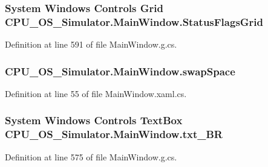 \subsubsection[{Status\+Flags\+Grid}]{\setlength{\rightskip}{0pt plus 5cm}System Windows Controls Grid C\+P\+U\+\_\+\+O\+S\+\_\+\+Simulator.\+Main\+Window.\+Status\+Flags\+Grid\hspace{0.3cm}{\ttfamily [package]}}\label{class_c_p_u___o_s___simulator_1_1_main_window_afdda5e5a39c6e3b99300284ea2640e7c}


Definition at line 591 of file Main\+Window.\+g.\+cs.

\hypertarget{class_c_p_u___o_s___simulator_1_1_main_window_ab9638abdc8d65670240a036bc02d813c}{}
\subsubsection[{swap\+Space}]{ C\+P\+U\+\_\+\+O\+S\+\_\+\+Simulator.\+Main\+Window.\+swap\+Space\hspace{0.3cm}{\ttfamily [private]}}\label{class_c_p_u___o_s___simulator_1_1_main_window_ab9638abdc8d65670240a036bc02d813c}


Definition at line 55 of file Main\+Window.\+xaml.\+cs.

\hypertarget{class_c_p_u___o_s___simulator_1_1_main_window_a7a878022ed4cb948598d3685dc821a00}{}
\subsubsection[{txt\+\_\+\+B\+R}]{\setlength{\rightskip}{0pt plus 5cm}System Windows Controls Text\+Box C\+P\+U\+\_\+\+O\+S\+\_\+\+Simulator.\+Main\+Window.\+txt\+\_\+\+B\+R\hspace{0.3cm}{\ttfamily [package]}}\label{class_c_p_u___o_s___simulator_1_1_main_window_a7a878022ed4cb948598d3685dc821a00}


Definition at line 575 of file Main\+Window.\+g.\+cs.


